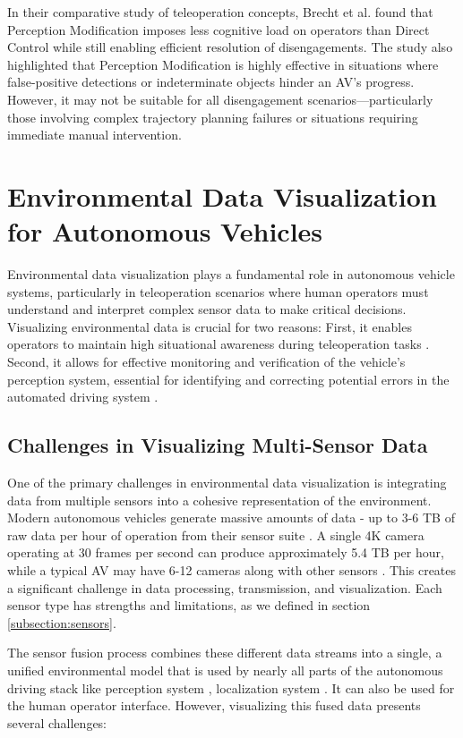 In their comparative study of teleoperation concepts, Brecht et al. \cite{Brecht} found
that Perception Modification imposes less cognitive load on operators than
Direct Control while still enabling efficient resolution of disengagements.
The study also highlighted that Perception Modification is highly effective in
situations where false-positive detections or indeterminate objects hinder an AV's progress.
However, it may not be suitable for all disengagement scenarios—particularly those
involving complex trajectory planning failures or situations requiring immediate manual intervention.

\section{Environmental Data Visualization for Autonomous Vehicles}
Environmental data visualization plays a fundamental role in autonomous vehicle systems,
particularly in teleoperation scenarios where human operators must understand and interpret
complex sensor data to make critical decisions.
Visualizing environmental data is crucial for two reasons: First, it enables operators to
maintain high situational awareness during
teleoperation tasks \cite{Gnatzig}. Second, it allows for effective monitoring and verification
of the vehicle's perception system, essential for identifying and correcting potential errors
in the automated driving system \cite{feiler2023perception}.

\subsection{Challenges in Visualizing Multi-Sensor Data}
One of the primary challenges in environmental data visualization is integrating data from multiple
sensors into a cohesive representation of the environment. Modern autonomous vehicles generate
massive amounts of data - up to 3-6 TB of raw data per hour of operation from their sensor suite \cite{kazhamiaka2021challenges}
. A single 4K camera operating at 30 frames per second can produce
approximately 5.4 TB per hour, while a typical AV may have 6-12 cameras along with other sensors \cite{visualcapitalist2024}
. This creates a significant challenge in data processing, transmission,
and visualization. Each sensor type has strengths and limitations, as we defined in section \ref{subsection:sensors}.

The sensor fusion process combines these different data streams into a single, a unified environmental
model that is used by nearly all parts of the autonomous driving stack like perception system \cite{feng2020deep}
, localization system \cite{feng2020deep, el-sheimy2020sensorfusion}. It can also be used for the human operator interface.
However, visualizing this fused data presents several challenges:

